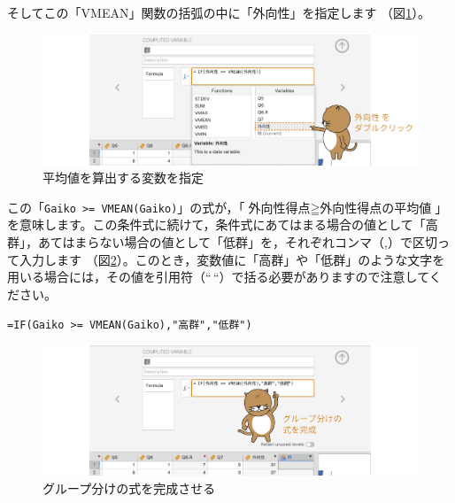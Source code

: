 \documentclass[
  12pt,
  a5jpaper,
  lualatex, ja=standard]{bxjsbook}
\newenvironment{jmvgray}{%
	\begin{center}%
	\begin{tcolorbox}[%
		colframe=gline,
		colbacktitle=gmoji,
		colback=gmoji!2!white,
		breakable,
		width=.9\textwidth,
		]\small\addtolength{\leftmargini}{-3\labelsep}%
	}%
	{\end{tcolorbox}\end{center}}
\begin{document}
そしてこの「VMEAN」関数の括弧の中に「外向性」を指定します
（図\ref{fig:basics-exercise-group-vmean-gaiko}）。

\begin{figure}[!ht]

{\centering \includegraphics[width=1\linewidth]{images/basics/exercise-group-vmean-gaiko} 

}

\caption{平均値を算出する変数を指定}\label{fig:basics-exercise-group-vmean-gaiko}
\end{figure}

この「\texttt{Gaiko\ \textgreater{}=\ VMEAN(Gaiko)}」の式が，「\(\text{外向性得点} \geqq \text{外向性得点の平均値}\)」を意味します。この条件式に続けて，条件式にあてはまる場合の値として「高群」，あてはまらない場合の値として「低群」を，それぞれコンマ（,）で区切って入力します
（図\ref{fig:basics-exercise-group-if-full}）。このとき，変数値に「高群」や「低群」のような文字を用いる場合には，その値を引用符（``\,``）で括る必要がありますので注意してください。

\begin{jmvgray}
  \verb|=IF(Gaiko >= VMEAN(Gaiko),"高群","低群")|
\end{jmvgray}

\begin{figure}[!ht]

{\centering \includegraphics[width=1\linewidth]{images/basics/exercise-group-if-full} 

}

\caption{グループ分けの式を完成させる}\label{fig:basics-exercise-group-if-full}
\end{figure}
\end{document}
